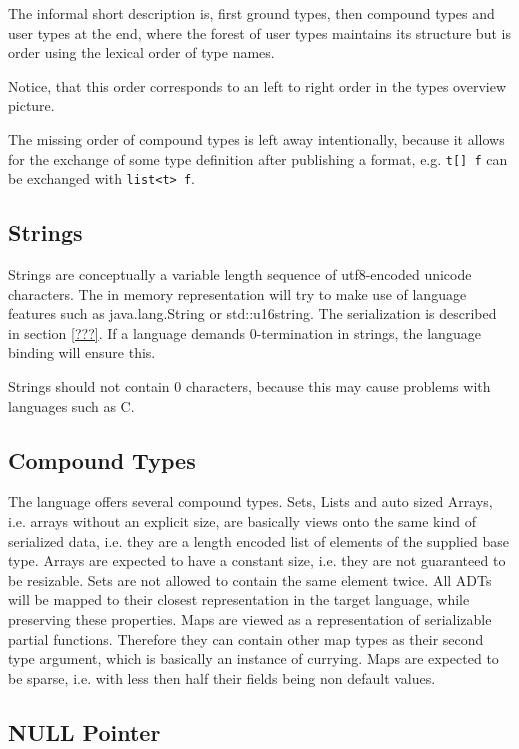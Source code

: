 The informal short description is, first ground types, then compound types and user types at the end, where the forest of user types maintains its structure but is order using the lexical order of type names.

Notice, that this order corresponds to an left to right order in the types overview picture.

The missing order of compound types is left away intentionally, because it allows for the exchange of some type definition after publishing a format, e.g. \verb/t[] f/ can be exchanged with \verb/list<t> f/.


\subsection{Strings}

Strings are conceptually a variable length sequence of utf8-encoded unicode characters. The in memory representation will try to make use of language features such as java.lang.String or std::u16string. The serialization is described in section \ref{???}. If a language demands 0-termination in strings, the language binding will ensure this.

Strings should not contain 0 characters, because this may cause problems with languages such as C.


\subsection{Compound Types}

The language offers several compound types. Sets, Lists and auto sized Arrays, i.e. arrays without an explicit size, are basically views onto the same kind of serialized data, i.e. they are a length encoded list of elements of the supplied base type. Arrays are expected to have a constant size, i.e. they are not guaranteed to be resizable. Sets are not allowed to contain the same element twice.
All ADTs will be mapped to their closest representation in the target language, while preserving these properties.
Maps are viewed as a representation of serializable partial functions. Therefore they can contain other map types as their second type argument, which is basically an instance of currying. Maps are expected to be sparse, i.e. with less then half their fields being non default values.

\subsection{NULL Pointer}

